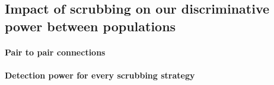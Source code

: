 \documentclass[authoryear,preprint,review]{elsarticle}
\begin{document}
\subsection{Impact of scrubbing on our discriminative power between populations}
\paragraph{Pair to pair connections}
\paragraph{Detection power for every scrubbing strategy}

\end{document}
